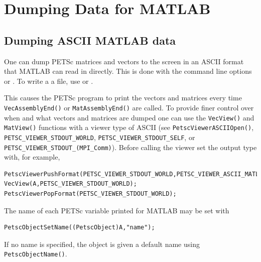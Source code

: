\section{Dumping Data for MATLAB}
\label{sec_matlabdump}
\subsection{Dumping ASCII MATLAB data}
One can dump PETSc matrices and vectors to the screen in an ASCII format that MATLAB can read in directly. This is done with the
command line options  or . 
To write a a file, use  or .

This causes the PETSc program
to print the vectors and matrices every time \lstinline{VecAssemblyEnd()} or \lstinline{MatAssemblyEnd()} are called.   
To provide finer control
over when and what vectors and matrices are dumped one can use the \lstinline{VecView()} and
\lstinline{MatView()} functions with a viewer type of ASCII (see \lstinline{PetscViewerASCIIOpen()},
\lstinline{PETSC_VIEWER_STDOUT_WORLD}, \lstinline{PETSC_VIEWER_STDOUT_SELF}, or \lstinline{PETSC_VIEWER_STDOUT_(MPI_Comm)}). Before calling
the viewer set the output type with, for example,
\begin{lstlisting}
PetscViewerPushFormat(PETSC_VIEWER_STDOUT_WORLD,PETSC_VIEWER_ASCII_MATLAB);
VecView(A,PETSC_VIEWER_STDOUT_WORLD);
PetscViewerPopFormat(PETSC_VIEWER_STDOUT_WORLD);  
\end{lstlisting}
The name of each PETSc variable printed for MATLAB may be set with
\begin{lstlisting}
PetscObjectSetName((PetscObject)A,"name");
\end{lstlisting}
If no name is specified, the object is given a default name using \lstinline{PetscObjectName()}.

